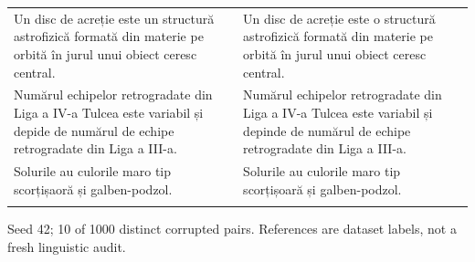 \documentclass[10pt]{article}
\begin{document}
{\begin{tabular}{@{}>{\raggedright\arraybackslash}p{}@{\hspace{0.04\textwidth}}>{\raggedright\arraybackslash}p{}@{}}
Un disc de acreție este un structură astrofizică formată din materie pe orbită în jurul unui obiect ceresc central. & Un disc de acreție este o structură astrofizică formată din materie pe orbită în jurul unui obiect ceresc central. \\ \addlinespace[5pt]
Numărul echipelor retrogradate din Liga a IV-a Tulcea este variabil și depide de numărul de echipe retrogradate din Liga a III-a. & Numărul echipelor retrogradate din Liga a IV-a Tulcea este variabil și depinde de numărul de echipe retrogradate din Liga a III-a. \\ \addlinespace[5pt]
Solurile au culorile maro tip scorțișaoră și galben-podzol. & Solurile au culorile maro tip scorțișoară și galben-podzol. \\ \addlinespace[5pt]
\bottomrule\end{tabular}}%
\ifdim\dimexpr\ht\pairtable+\dp\pairtable\relax>0.82\textheight%
\resizebox*{!}{0.82\textheight}{\usebox{\pairtable}}%
\else\usebox{\pairtable}\fi%
\par\smallskip\footnotesize Seed 42; 10 of 1000 distinct corrupted pairs. References are dataset labels, not a fresh linguistic audit.\normalsize
\clearpage
\end{document}
